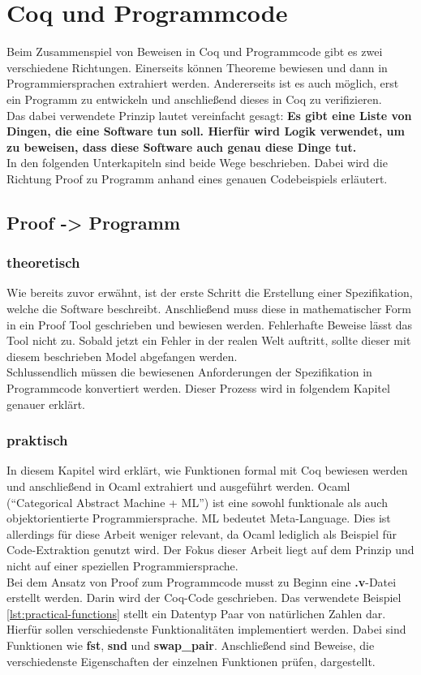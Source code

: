 \section{Coq und Programmcode}
\label{s:coq-and-code}

Beim Zusammenspiel von Beweisen in Coq und Programmcode gibt es zwei verschiedene Richtungen. Einerseits können Theoreme bewiesen und dann in Programmiersprachen extrahiert werden. Andererseits ist es auch möglich, erst ein Programm zu entwickeln und anschließend dieses in Coq zu verifizieren. \\
Das dabei verwendete Prinzip lautet vereinfacht gesagt:
\textbf{Es gibt eine Liste von Dingen, die eine Software tun soll. Hierfür wird Logik verwendet, um zu beweisen, dass diese Software auch genau diese Dinge tut.}
\\
In den folgenden Unterkapiteln sind beide Wege beschrieben. Dabei wird die Richtung Proof zu Programm anhand eines genauen Codebeispiels erläutert.

\subsection{Proof -> Programm}
\subsubsection{theoretisch}
{Wie bereits zuvor erwähnt, ist der erste Schritt die Erstellung einer Spezifikation, welche die Software beschreibt. Anschließend muss diese in mathematischer Form in ein Proof Tool geschrieben und bewiesen werden. Fehlerhafte Beweise lässt das Tool nicht zu.
Sobald jetzt ein Fehler in der realen Welt auftritt, sollte dieser mit diesem beschrieben Model abgefangen werden. \\
Schlussendlich müssen die bewiesenen Anforderungen der Spezifikation in Programmcode konvertiert werden. Dieser Prozess wird in folgendem Kapitel genauer erklärt.}\cite{HELWER01:FV}

\subsubsection{praktisch}
In diesem Kapitel wird erklärt, wie Funktionen formal mit Coq bewiesen werden und anschließend in Ocaml extrahiert und ausgeführt werden. Ocaml ("`Categorical Abstract Machine + ML"') ist eine sowohl funktionale als auch objektorientierte Programmiersprache. ML bedeutet Meta-Language. Dies ist allerdings für diese Arbeit weniger relevant, da Ocaml lediglich als Beispiel für Code-Extraktion genutzt wird. Der Fokus dieser Arbeit liegt auf dem Prinzip und nicht auf einer speziellen Programmiersprache.\\
Bei dem Ansatz von Proof zum Programmcode musst zu Beginn eine \textbf{.v}-Datei erstellt werden. Darin wird der Coq-Code geschrieben. Das verwendete Beispiel \ref{lst:practical-functions} stellt ein Datentyp Paar von natürlichen Zahlen dar. Hierfür sollen verschiedenste Funktionalitäten implementiert werden. Dabei sind Funktionen wie \textbf{fst}, \textbf{snd} und \textbf{swap\_pair}. Anschließend sind Beweise, die verschiedenste Eigenschaften der einzelnen Funktionen prüfen, dargestellt.

